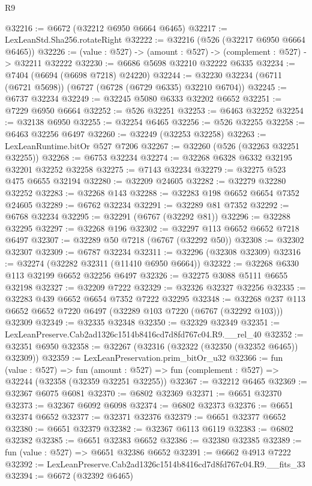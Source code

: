 \begin{lexlean}{R9}
\begin{coremodule}
@32216 := @6672 (@32212 @6950 @6664 @6465)
@32217 := LexLeanStd.Sha256.rotateRight
@32222 := @32216 (@526 (@32217 @6950 @6664 @6465))
@32226 := (value : @527) -> (amount : @527) -> (complement : @527) -> @32211 @32222
@32230 := @6686 @5698 @32210 @32222 @6335
@32234 := @7404 (@6694 (@6698 @7218) @24220)
@32244 := @32230 @32234 (@6711 (@6721 @5698)) (@6727 (@6728 (@6729 @6335) @32210 @6704))
@32245 := @6737 @32234
@32249 := @32245 @5080 @6333 @32202 @6652
@32251 := @7229 @6950 @6664
@32252 := @526 @32251
@32253 := @6463 @32252
@32254 := @32138 @6950
@32255 := @32254 @6465
@32256 := @526 @32255
@32258 := @6463 @32256 @6497
@32260 := @32249 (@32253 @32258)
@32263 := LexLeanRuntime.bitOr @527 @7206
@32267 := @32260 (@526 (@32263 @32251 @32255))
@32268 := @6753 @32234
@32274 := @32268 @6328 @6332 @32195 @32201 @32252 @32258
@32275 := @7143 @32234
@32279 := @32275 @523 @475 @6655 @32194
@32280 := @32209 @24605
@32282 := @32279 @32280 @32252
@32283 := @32268 @143
@32288 := @32283 @198 @6652 @6654 @7352 @24605
@32289 := @6762 @32234
@32291 := @32289 @81 @7352
@32292 := @6768 @32234
@32295 := @32291 (@6767 (@32292 @81))
@32296 := @32288 @32295
@32297 := @32268 @196
@32302 := @32297 @113 @6652 @6652 @7218 @6497
@32307 := @32289 @50 @7218 (@6767 (@32292 @50))
@32308 := @32302 @32307
@32309 := @6787 @32234
@32311 := @32296 (@32308 @32309)
@32316 := @32274 (@32282 @32311 (@11410 @6950 @6664))
@32322 := @32268 @6330 @113 @32199 @6652 @32256 @6497
@32326 := @32275 @3088 @5111 @6655 @32198
@32327 := @32209 @7222
@32329 := @32326 @32327 @32256
@32335 := @32283 @439 @6652 @6654 @7352 @7222 @32295
@32348 := @32268 @237 @113 @6652 @6652 @7220 @6497 (@32289 @103 @7220 (@6767 (@32292 @103))) @32309
@32349 := @32335 @32348
@32350 := @32329 @32349
@32351 := LexLeanPreserve.Cab2ad1326c1514b8416cd7d8fd767c04.R9.__rel_40
@32352 := @32351 @6950
@32358 := @32267 (@32316 (@32322 (@32350 (@32352 @6465)) @32309))
@32359 := LexLeanPreservation.prim_bitOr_u32
@32366 := fun (value : @527) =>
  fun (amount : @527) => fun (complement : @527) => @32244 (@32358 (@32359 @32251 @32255))
@32367 := @32212 @6465
@32369 := @32367 @6075 @6081
@32370 := @6802 @32369
@32371 := @6651 @32370
@32373 := @32367 @6092 @6098
@32374 := @6802 @32373
@32376 := @6651 @32374 @6652
@32377 := @32371 @32376
@32379 := @6651 @32377 @6652
@32380 := @6651 @32379
@32382 := @32367 @6113 @6119
@32383 := @6802 @32382
@32385 := @6651 @32383 @6652
@32386 := @32380 @32385
@32389 := fun (value : @527) => @6651 @32386 @6652
@32391 := @6662 @4913 @7222
@32392 := LexLeanPreserve.Cab2ad1326c1514b8416cd7d8fd767c04.R9.__fits_33
@32394 := @6672 (@32392 @6465)

\end{coremodule}
\end{lexlean}
